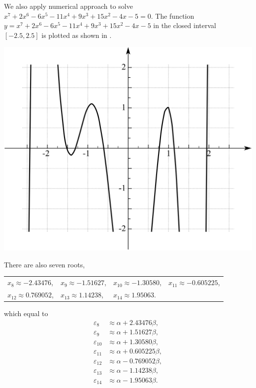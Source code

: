 		We also apply numerical approach to solve $x^7 + 2x^6 - 6x^5 - 11x^4 + 9x^3 +15x^2 -4x -5 = 0$. The function $y=x^7 + 2x^6 - 6x^5 - 11x^4 + 9x^3 +15x^2 -4x -5$ in the closed interval $[-2.5, 2.5]$ is plotted as shown in .
		\begin{center}
		\includegraphics[scale=1]{./structures/exercise_1/phenanthrene/996.png}
		\label{fig:poly_b1}
		\end{center}
						
		There are also seven roots,
		\begin{center}
		\begin{tabular}{llll}
			$x_8 \approx -2.43476$, & $x_9 \approx -1.51627$, & $x_{10} \approx -1.30580$, & $x_{11} \approx -0.605225 $, \\
			$x_{12} \approx 0.769052$, & $x_{13} \approx 1.14238$, & $x_{14} \approx 1.95063$. &
		\end{tabular}
		\end{center}
		which equal to	
		\begin{align}
			\varepsilon_8 &\approx \alpha + 2.43476 \beta , \\
			\varepsilon_9 &\approx \alpha + 1.51627 \beta , \\
			\varepsilon_{10} &\approx \alpha + 1.30580 \beta , \\
			\varepsilon_{11} &\approx \alpha + 0.605225 \beta , \\
			\varepsilon_{12} &\approx \alpha - 0.769052 \beta , \\
			\varepsilon_{13} &\approx \alpha - 1.14238 \beta , \\
			\varepsilon_{14} &\approx \alpha - 1.95063 \beta .
		\end{align}
		
